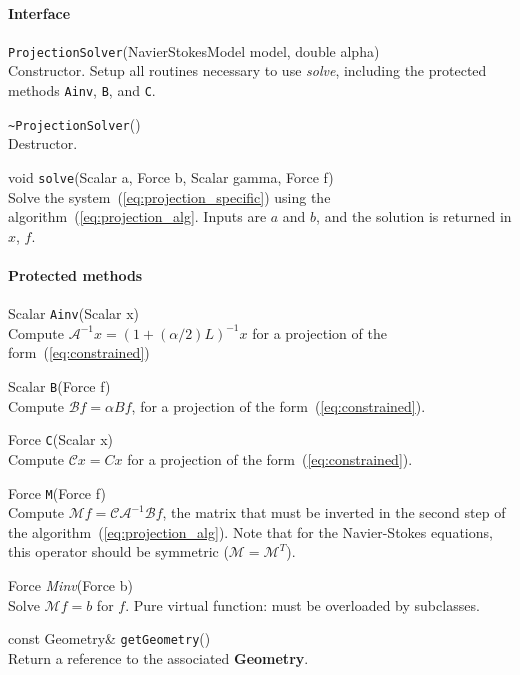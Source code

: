 \documentclass[11pt]{article}
\def\class#1{{\bf #1}} %
\def\fn#1{{\tt #1}} %
\def\virtualfn#1{{\it #1}} %
\begin{document}
\paragraph{Interface}
\begin{description}
	\item \fn{ProjectionSolver}(NavierStokesModel model, double alpha)\\
		Constructor.  Setup all routines necessary to use \virtualfn{solve}, including the protected methods \fn{Ainv}, \fn{B}, and \fn{C}.
	\item \fn{\~\null ProjectionSolver}()\\
		Destructor.
	\item void \fn{solve}(Scalar a, Force b, Scalar gamma, Force f)\\
	 	Solve the system~(\ref{eq:projection_specific}) using the algorithm~(\ref{eq:projection_alg}.  Inputs are $a$ and $b$, and the solution is returned in $x$, $f$.
\end{description}
\paragraph{Protected methods}
\begin{description}
	\item Scalar \fn{Ainv}(Scalar x)\\
		Compute $\mathcal{A}^{-1}x=(1+(\alpha/2)L)^{-1}x$ for a projection of the form~(\ref{eq:constrained})
	\item Scalar \fn{B}(Force f)\\
		Compute $\mathcal{B}f=\alpha Bf$, for a projection of the form~(\ref{eq:constrained}).
	\item Force \fn{C}(Scalar x)\\
		Compute $\mathcal{C}x=Cx$ for a projection of the form~(\ref{eq:constrained}).
	\item Force \fn{M}(Force f)\\
		Compute $\mathcal{M}f=\mathcal{C}\mathcal{A}^{-1}\mathcal{B}f$, the matrix that must be inverted in the second step of the algorithm~(\ref{eq:projection_alg}).  Note that for the Navier-Stokes equations, this operator should be symmetric ($\mathcal{M}=\mathcal{M}^T$).
	\item Force \virtualfn{Minv}(Force b)\\
		Solve $\mathcal{M}f=b$ for $f$.  Pure virtual function: must be overloaded by subclasses.
	\item const Geometry\& \fn{getGeometry}()\\
		Return a reference to the associated \class{Geometry}.
\end{description}
\end{document}
